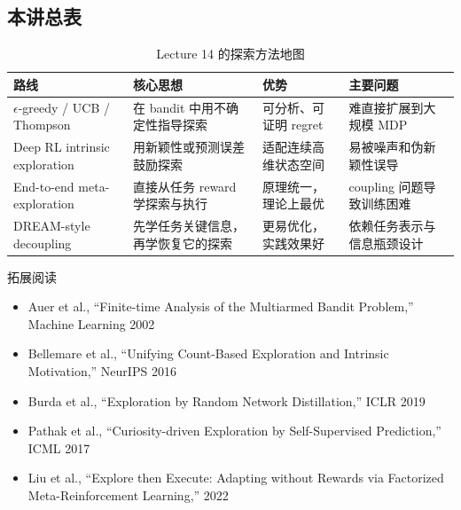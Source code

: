 \documentclass[a4paper]{article}
\begin{document}
\subsection{本讲总表}

\begin{table}[H]
\centering
\begin{tabular}{p{} p{} p{} p{}}
\toprule
路线 & 核心思想 & 优势 & 主要问题 \\
\midrule
$\epsilon$-greedy / UCB / Thompson & 在 bandit 中用不确定性指导探索 & 可分析、可证明 regret & 难直接扩展到大规模 MDP \\
Deep RL intrinsic exploration & 用新颖性或预测误差鼓励探索 & 适配连续高维状态空间 & 易被噪声和伪新颖性误导 \\
End-to-end meta-exploration & 直接从任务 reward 学探索与执行 & 原理统一，理论上最优 & coupling 问题导致训练困难 \\
DREAM-style decoupling & 先学任务关键信息，再学恢复它的探索 & 更易优化，实践效果好 & 依赖任务表示与信息瓶颈设计 \\
\bottomrule
\end{tabular}
\caption{Lecture 14 的探索方法地图}
\end{table}

\begin{knowledgebox}{拓展阅读}
\begin{itemize}
    \item Auer et al., ``Finite-time Analysis of the Multiarmed Bandit Problem,'' Machine Learning 2002
    \item Bellemare et al., ``Unifying Count-Based Exploration and Intrinsic Motivation,'' NeurIPS 2016
    \item Burda et al., ``Exploration by Random Network Distillation,'' ICLR 2019
    \item Pathak et al., ``Curiosity-driven Exploration by Self-Supervised Prediction,'' ICML 2017
    \item Liu et al., ``Explore then Execute: Adapting without Rewards via Factorized Meta-Reinforcement Learning,'' 2022
\end{itemize}
\end{knowledgebox}
\end{document}
